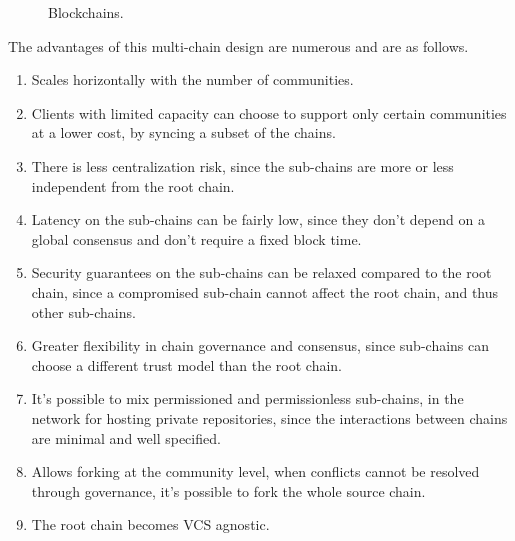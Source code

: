 \begin{figure}[htp]
\caption{Blockchains.}
\end{figure}

\bigskip

The advantages of this multi-chain design are numerous and are as follows.

\begin{enumerate}
    \item Scales horizontally with the number of communities.
    \item Clients with limited capacity can choose to support only certain
        communities at a lower cost, by syncing a subset of the chains.
    \item There is less centralization risk, since the sub-chains are more or
        less independent from the root chain.
    \item Latency on the sub-chains can be fairly low, since they don’t depend
        on a global consensus and don’t require a fixed block time.
    \item Security guarantees on the sub-chains can be relaxed compared to the
        root chain, since a compromised sub-chain cannot affect the root chain,
        and thus other sub-chains.
    \item Greater flexibility in chain governance and consensus, since
        sub-chains can choose a different trust model than the root chain.
    \item It's possible to mix permissioned and permissionless sub-chains,
        in the network \eg for hosting private repositories, since the
        interactions between chains are minimal and well specified.
    \item Allows forking at the community level, \eg when conflicts cannot be
        resolved through governance, it's possible to fork the whole source
        chain.
    \item The root chain becomes VCS agnostic.
\end{enumerate}

